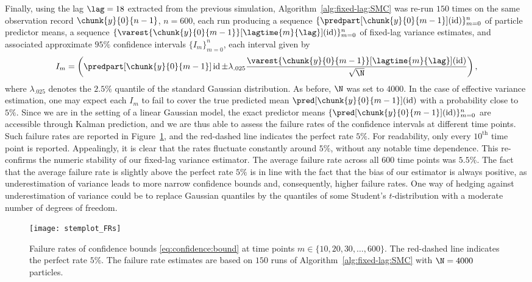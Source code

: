 Finally, using the lag $\lag = 18$ extracted from the previous simulation, Algorithm~\ref{alg:fixed-lag:SMC} was re-run $150$ times on the same observation record $\chunk{y}{0}{n - 1}$, $n = 600$, each run producing a sequence $\{ \predpart[\chunk{y}{0}{m - 1}](\operatorname{id}) \}_{m = 0}^n$ of particle predictor means, a sequence $\{ \varest{\chunk{y}{0}{m - 1}}[\lagtime{m}{\lag}](\operatorname{id}) \}_{m = 0}^n$ of fixed-lag variance estimates, and associated approximate $95\%$ confidence intervals $\{ I_m \}_{m = 0}^n$, each interval given by    
\begin{equation} \label{eq:confidence:bound}
I_m = \left(\predpart[\chunk{y}{0}{m - 1}] \operatorname{id} \pm \lambda_{.025} \frac{\varest{\chunk{y}{0}{m - 1}}[\lagtime{m}{\lag}](\operatorname{id})}{\sqrt{\N}} \right), 
\end{equation}
where $\lambda_{.025}$ denotes the $2.5\%$ quantile of the standard Gaussian distribution. As before, $\N$ was set to $4000$. In the case of effective variance estimation, one may expect each $I_m$ to fail to cover the true predicted mean $\pred[\chunk{y}{0}{m - 1}](\operatorname{id})$ with a probability close to $5\%$. Since we are in the setting of a linear Gaussian model, the exact predictor means $\{ \pred[\chunk{y}{0}{m - 1}](\operatorname{id}) \}_{m = 0}^n$ are accessible through Kalman prediction, and we are thus able to assess the failure rates of the confidence intervals at different time points. Such failure rates are reported in Figure~\ref{fig:stemplot:FRs}, and the red-dashed line indicates the perfect rate $5\%$. For readability, only every $10^{\mathrm{th}}$ time point is reported. Appealingly, it is clear that the rates fluctuate constantly around $5\%$, without any notable time dependence. This re-confirms the numeric stability of our fixed-lag variance estimator. The average failure rate across all $600$ time points was $5.5\%$. The fact that the average failure rate is slightly above the perfect rate $5\%$ is in line with the fact that the bias of our estimator is always positive, as underestimation of variance leads to more narrow confidence bounds and, consequently, higher failure rates. One way of hedging against underestimation of variance could be to replace Gaussian quantiles by the quantiles of some Student's $t$-distribution with a moderate number of degrees of freedom.  

\begin{figure}[H] 
\centering
\texttt{[image: stemplot\_FRs]} %
\caption{Failure rates of confidence bounds \eqref{eq:confidence:bound} at time points $m \in \{10, 20, 30, \ldots, 600\}$. The red-dashed line indicates the perfect rate $5\%$. The failure rate estimates are based on $150$ runs of Algorithm~\ref{alg:fixed-lag:SMC} with $\N = 4000$ particles.}
\label{fig:stemplot:FRs}
\end{figure}




